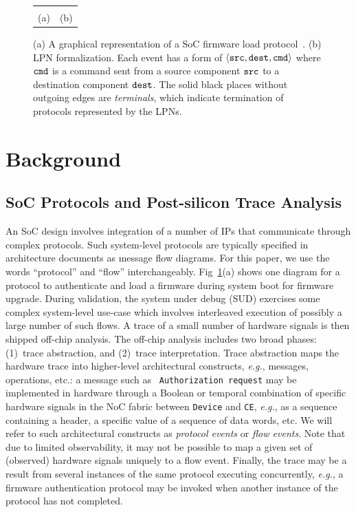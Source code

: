 \documentclass[conference]{IEEEtran}
\newcommand{\eg}{\mbox{{\em e.g.}}}
\begin{document}
\begin{figure}[tb]
\begin{center}
\begin{tabular}{cc}
\begin{minipage}{3in}
{\begin{tikzpicture}[node distance=3cm, auto,>=latex', thick]
\end{tikzpicture}
}
\end{minipage}
\\
(a) & (b)
\end{tabular}
\caption{(a) A graphical representation of a SoC firmware
  load protocol~\cite{Krstic14HOST}.  (b) LPN formalization.
  Each event has a form of $\langle {\tt src, dest, cmd}
  \rangle$ where ${\tt cmd}$ is a command sent from a source
  component ${\tt src}$ to a destination component ${\tt
    dest}$. The solid black places without outgoing edges
  are {\em terminals}, which indicate termination of
  protocols represented by the LPNs.}
\label{flow-spec-ex}
\end{center}
\end{figure}


\section{Background}

\subsection{SoC Protocols and Post-silicon Trace Analysis}

An SoC design involves integration of a number of IPs that
communicate through complex protocols.  Such system-level
protocols are typically specified in architecture documents
as message flow diagrams.  For this paper, we use the words
``protocol'' and ``flow'' interchangeably.
Fig~\ref{flow-spec-ex}(a) shows one diagram for a protocol
to authenticate and load a firmware during system boot for
firmware upgrade.  During validation, the system under debug
(SUD) exercises some complex system-level use-case which
involves interleaved execution of possibly a large number of
such flows.  A trace of a small number of hardware signals
is then shipped off-chip analysis.  The off-chip analysis
includes two broad phases: (1)~trace abstraction, and
(2)~trace interpretation.  Trace abstraction maps the
hardware trace into higher-level architectural constructs,
\eg, messages, operations, etc.: a message such as {\tt
  Authorization request} may be implemented in hardware
through a Boolean or temporal combination of specific
hardware signals in the NoC fabric between {\tt Device} and
{\tt CE}, \eg, as a sequence containing a header, a specific
value of a sequence of data words, etc.  We will refer to
such architectural constructs as {\em protocol events} or
{\em flow events}.  Note that due to limited observability,
it may not be possible to map a given set of (observed)
hardware signals uniquely to a flow event.  Finally, the
trace may be a result from several instances of the same
protocol executing concurrently, \eg, a firmware
authentication protocol may be invoked when another instance
of the protocol has not completed.
\end{document}
